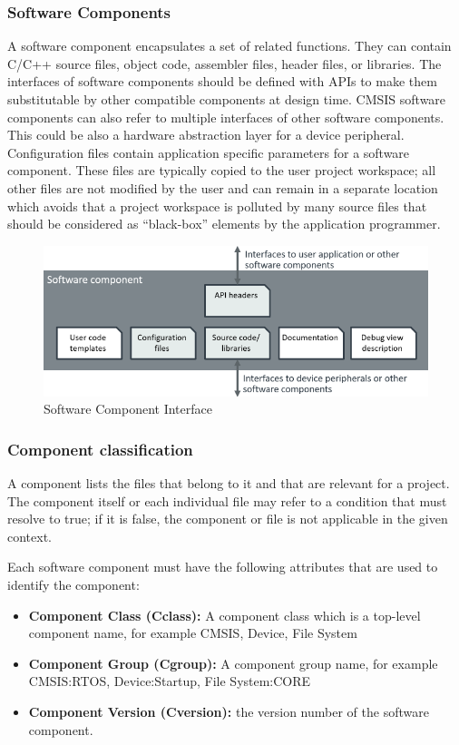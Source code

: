\subsubsection{Software Components}
A software component encapsulates a set of related functions. They can contain C/C++ source files, object code, assembler files, header files, or libraries. The interfaces of software components should be defined with APIs to make them substitutable by other compatible components at design time.
CMSIS software components can also refer to multiple interfaces of other software components. This could be also a hardware abstraction layer for a device peripheral.
Configuration files contain application specific parameters for a software component. These files are typically copied to the user project workspace; all other files are not modified by the user and can remain in a separate location which avoids that a project workspace is polluted by many source files that should be considered as “black-box” elements by the application programmer.
\begin{figure}[H]
  \centering
  \includegraphics[width=15cm]{img/ST_Summer_Internship/software_component.png}
  \caption{Software Component Interface}
  \label{fig:sw_comp}
\end{figure}
\subsubsection{Component classification}
A component lists the files that belong to it and that are relevant for a project. The component itself or each individual file may refer to a condition that must resolve to true; if it is false, the component or file is not applicable in the given context.

Each software component must have the following attributes that are used to identify the component:
\begin{itemize}
    \item \textbf{Component Class (Cclass):} A component class which is a top-level component name, for example CMSIS, Device, File System
    \item \textbf{Component Group (Cgroup):} A component group name, for example CMSIS:RTOS, Device:Startup, File System:CORE
    \item \textbf{Component Version (Cversion):} the version number of the software component.
\end{itemize}



